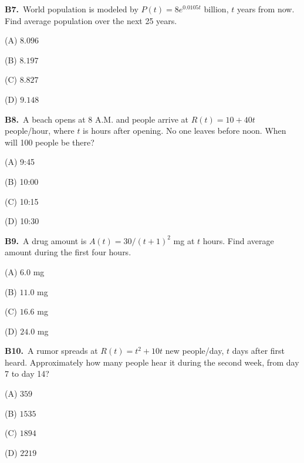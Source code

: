 \documentclass[11pt]{article}
\begin{document}
\bigskip\noindent\textbf{B7.}\ World population is modeled by $P(t)=8e^{0.0105t}$ billion, $t$ years from now. Find average population over the next 25 years.
\begin{list}{}{\setlength{\leftmargin}{3em}\setlength{\labelwidth}{2.5em}\setlength{\itemsep}{0pt}\setlength{\topsep}{2pt}}
\item[(A)] $8.096$
\item[(B)] $8.197$
\item[(C)] $8.827$
\item[(D)] $9.148$
\end{list}

\bigskip\noindent\textbf{B8.}\ A beach opens at 8 A.M. and people arrive at $R(t)=10+40t$ people/hour, where $t$ is hours after opening. No one leaves before noon. When will 100 people be there?
\begin{list}{}{\setlength{\leftmargin}{3em}\setlength{\labelwidth}{2.5em}\setlength{\itemsep}{0pt}\setlength{\topsep}{2pt}}
\item[(A)] 9:45
\item[(B)] 10:00
\item[(C)] 10:15
\item[(D)] 10:30
\end{list}

\bigskip\noindent\textbf{B9.}\ A drug amount is $A(t)=30/(t+1)^2$ mg at $t$ hours. Find average amount during the first four hours.
\begin{list}{}{\setlength{\leftmargin}{3em}\setlength{\labelwidth}{2.5em}\setlength{\itemsep}{0pt}\setlength{\topsep}{2pt}}
\item[(A)] $6.0$ mg
\item[(B)] $11.0$ mg
\item[(C)] $16.6$ mg
\item[(D)] $24.0$ mg
\end{list}

\bigskip\noindent\textbf{B10.}\ A rumor spreads at $R(t)=t^2+10t$ new people/day, $t$ days after first heard. Approximately how many people hear it during the second week, from day 7 to day 14?
\begin{list}{}{\setlength{\leftmargin}{3em}\setlength{\labelwidth}{2.5em}\setlength{\itemsep}{0pt}\setlength{\topsep}{2pt}}
\item[(A)] $359$
\item[(B)] $1535$
\item[(C)] $1894$
\item[(D)] $2219$
\end{list}
\end{document}
